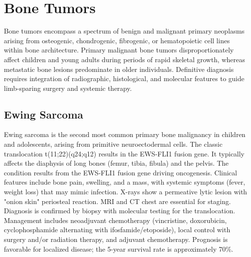 \section{Bone Tumors}




Bone tumors encompass a spectrum of benign and malignant primary neoplasms arising from osteogenic, chondrogenic, fibrogenic, or hematopoietic cell lines within bone architecture. Primary malignant bone tumors disproportionately affect children and young adults during periods of rapid skeletal growth, whereas metastatic bone lesions predominate in older individuals. Definitive diagnosis requires integration of radiographic, histological, and molecular features to guide limb-sparing surgery and systemic therapy.





\label{sec:Bone Tumors}

\subsection{Ewing Sarcoma}
\label{sec:Ewing Sarcoma}
Ewing sarcoma is the second most common primary bone malignancy in children and adolescents, arising from primitive neuroectodermal cells. The classic translocation t(11;22)(q24;q12) results in the EWS-FLI1 fusion gene. It typically affects the diaphysis of long bones (femur, tibia, fibula) and the pelvis. The condition results from the EWS-FLI1 fusion gene driving oncogenesis. Clinical features include bone pain, swelling, and a mass, with systemic symptoms (fever, weight loss) that may mimic infection. X-rays show a permeative lytic lesion with "onion skin" periosteal reaction. MRI and CT chest are essential for staging. Diagnosis is confirmed by biopsy with molecular testing for the translocation. Management includes neoadjuvant chemotherapy (vincristine, doxorubicin, cyclophosphamide alternating with ifosfamide/etoposide), local control with surgery and/or radiation therapy, and adjuvant chemotherapy. Prognosis is favorable for localized disease; the 5-year survival rate is approximately 70\%.

